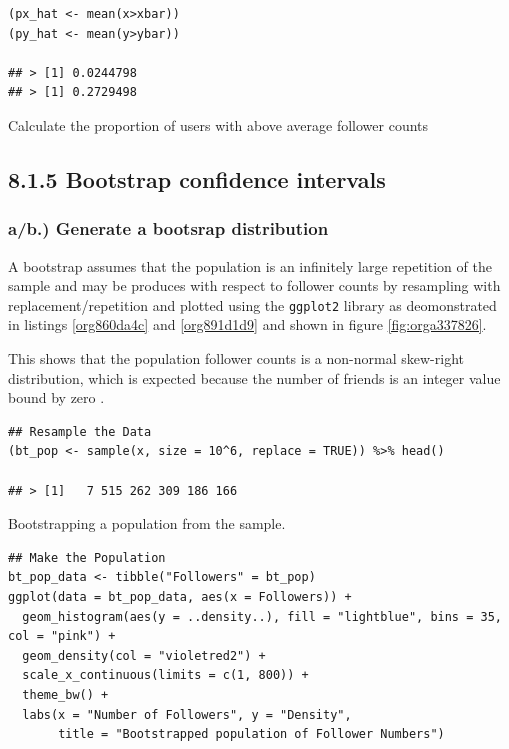 \documentclass[11pt]{article}
\begin{document}
\begin{listing}[htbp]
\begin{verbatim}
(px_hat <- mean(x>xbar))
(py_hat <- mean(y>ybar))

## > [1] 0.0244798
## > [1] 0.2729498
\end{verbatim}
\caption{\label{org361fcc4}Calculate the proportion of users with above average follower counts}
\end{listing}


\subsection{8.1.5 Bootstrap confidence intervals}
\label{sec:org37a3f2d}
\subsubsection{a/b.) Generate a bootsrap distribution}
\label{sec:org783e648}

A bootstrap assumes that the population is an infinitely large repetition of the
sample and may be produces with respect to follower counts by resampling with
replacement/repetition and plotted using the \texttt{ggplot2} library as deomonstrated
in listings \ref{org860da4c} and \ref{org891d1d9} and shown in figure \ref{fig:orga337826}.

This shows that the population follower counts is a non-normal skew-right
distribution, which is expected because the number of friends is an integer value bound by zero \cite{nist2013}.

\begin{listing}[htbp]
\begin{verbatim}
## Resample the Data
(bt_pop <- sample(x, size = 10^6, replace = TRUE)) %>% head()

## > [1]   7 515 262 309 186 166
\end{verbatim}
\caption{\label{org860da4c}Bootstrapping a population from the sample.}
\end{listing}

\begin{listing}[htbp]
\begin{verbatim}
## Make the Population
bt_pop_data <- tibble("Followers" = bt_pop)
ggplot(data = bt_pop_data, aes(x = Followers)) +
  geom_histogram(aes(y = ..density..), fill = "lightblue", bins = 35, col = "pink") +
  geom_density(col = "violetred2") +
  scale_x_continuous(limits = c(1, 800)) +
  theme_bw() +
  labs(x = "Number of Followers", y = "Density",
       title = "Bootstrapped population of Follower Numbers")

\end{verbatim}
\label{org891d1d9}
\end{listing}
\end{document}
